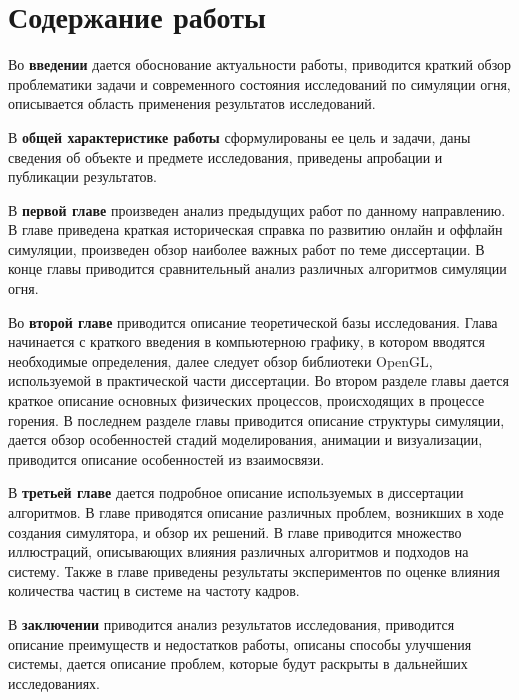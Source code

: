\part*{Содержание работы}

Во \textbf{введении} дается обоснование актуальности работы, приводится краткий
обзор проблематики задачи и современного состояния исследований по симуляции
огня, описывается область применения результатов исследований.

В \textbf{общей характеристике работы} сформулированы ее цель и задачи, даны
сведения об объекте и предмете исследования, приведены апробации и публикации
результатов.

В \textbf{первой главе} произведен анализ предыдущих работ по данному
направлению. В главе приведена краткая историческая справка по развитию онлайн и
оффлайн симуляции, произведен обзор наиболее важных работ по теме диссертации. В
конце главы приводится сравнительный анализ различных алгоритмов симуляции огня.

Во \textbf{второй главе} приводится описание теоретической базы исследования.
Глава начинается с краткого введения в компьютерною графику, в котором
вводятся необходимые определения, далее следует обзор библиотеки
OpenGL, используемой в практической части диссертации. Во втором разделе главы
дается краткое описание основных физических процессов, происходящих в процессе
горения. В последнем разделе главы приводится описание структуры симуляции,
дается обзор особенностей стадий моделирования, анимации и визуализации,
приводится описание особенностей из взаимосвязи.

В \textbf{третьей главе} дается подробное описание используемых в диссертации
алгоритмов. В главе приводятся описание различных проблем, возникших в ходе
создания симулятора, и обзор их решений. В главе приводится множество
иллюстраций, описывающих влияния различных алгоритмов и подходов на систему.
Также в главе приведены результаты экспериментов по оценке влияния количества
частиц в системе на частоту кадров.

В \textbf{заключении} приводится анализ результатов исследования, приводится
описание преимуществ и недостатков работы, описаны способы улучшения системы,
дается описание проблем, которые будут раскрыты в дальнейших исследованиях.
